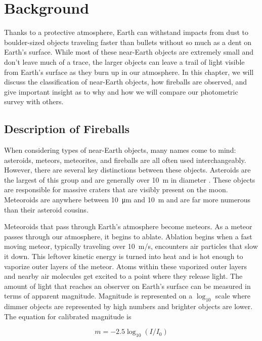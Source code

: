 \chapter{Background}

Thanks to a protective atmosphere, Earth can withstand impacts from dust to boulder-sized objects traveling faster than bullets without so much as a dent on Earth's surface.
While most of these near-Earth objects are extremely small and don't leave much of a trace, the larger objects can leave a trail of light visible from Earth's surface as they burn up in our atmosphere.
In this chapter, we will discuss the classification of near-Earth objects, how fireballs are observed, and give important insight as to why and how we will compare our photometric survey with others.


\section{Description of Fireballs}

When considering types of near-Earth objects, many names come to mind: asteroids, meteors, meteorites, and fireballs are all often used interchangeably. 
However, there are several key distinctions between these objects.  
Asteroids are the largest of this group and are generally over \SI{10}{\meter} in diameter \cite{steel_meteoroid_1996}. 
These objects are responsible for massive craters that are visibly present on the moon.
Meteoroids are anywhere between \SI{10}{\micro\meter} and \SI{10}{\meter} and are far more numerous than their asteroid cousins.  

Meteoroids that pass through Earth's atmosphere become meteors.
As a meteor passes through our atmosphere, it begins to ablate.
Ablation begins when a fast moving meteor, typically traveling over \SI{10}{\meter/\second}, encounters air particles that slow it down.
This leftover kinetic energy is turned into heat and is hot enough to vaporize outer layers of the meteor.  
Atoms within these vaporized outer layers and nearby air molecules get excited to a point where they release light.
The amount of light that reaches an observer on Earth's surface can be measured in terms of apparent magnitude.
Magnitude is represented on a $\log_{10}$ scale where dimmer objects are represented by high numbers and brighter objects are lower.
The equation for calibrated magnitude is

 $$ m = -2.5 \log_{10}(I/I_0)$$


